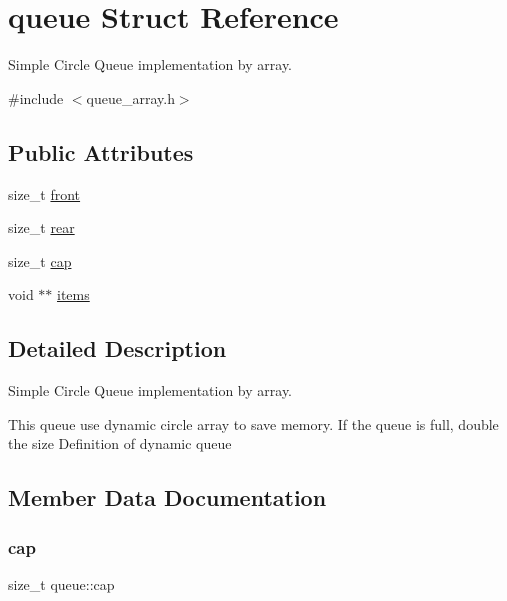 \hypertarget{structqueue}{}\section{queue Struct Reference}
\label{structqueue}


Simple Circle Queue implementation by array.  




{\ttfamily \#include $<$queue\+\_\+array.\+h$>$}

\subsection*{Public Attributes}
\begin{DoxyCompactItemize}
\item 
size\+\_\+t \mbox{\hyperlink{structqueue_a4fab87a90c34561a806c1837eb4774c6}{front}}
\item 
size\+\_\+t \mbox{\hyperlink{structqueue_a71eff21c56cc3644a766901cd21f773d}{rear}}
\item 
size\+\_\+t \mbox{\hyperlink{structqueue_ac87392c867b092d5cd96ed1b448f9eb3}{cap}}
\item 
void $\ast$$\ast$ \mbox{\hyperlink{structqueue_a4c90fc914a6825a61866f13ce4fdb225}{items}}
\end{DoxyCompactItemize}


\subsection{Detailed Description}
Simple Circle Queue implementation by array. 

This queue use dynamic circle array to save memory. If the queue is full, double the size Definition of dynamic queue 

\subsection{Member Data Documentation}
\mbox{\label{structqueue_ac87392c867b092d5cd96ed1b448f9eb3}} 
\subsubsection{\texorpdfstring{cap}{cap}}
{\footnotesize\ttfamily size\+\_\+t queue\+::cap}

\mbox{\label{structqueue_a4fab87a90c34561a806c1837eb4774c6}} 
